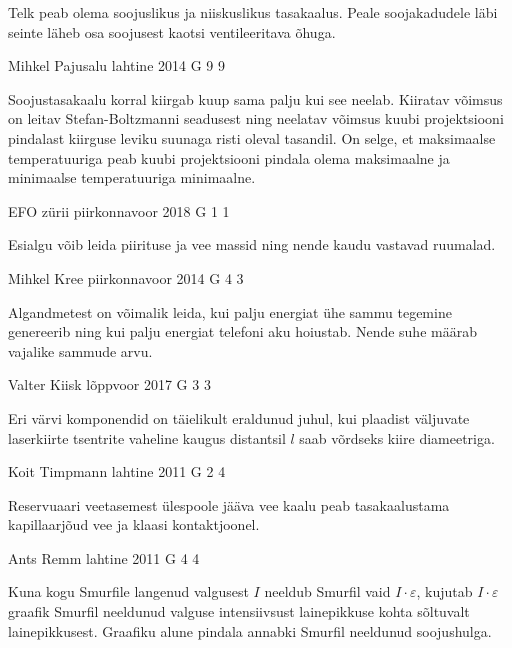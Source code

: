 \documentclass[11pt, twoside]{article}
\begin{document}
{{\ifHint
Telk peab olema soojuslikus ja niiskuslikus tasakaalus. Peale soojakadudele läbi seinte läheb osa soojusest kaotsi ventileeritava õhuga.
\fi
}

{Mihkel Pajusalu} %
{lahtine} %
{2014} %
{G 9} %
{9} %
{

\ifHint
Soojustasakaalu korral kiirgab kuup sama palju kui see neelab. Kiiratav võimsus on leitav Stefan-Boltzmanni seadusest ning neelatav võimsus kuubi projektsiooni pindalast kiirguse leviku suunaga risti oleval tasandil. On selge, et maksimaalse temperatuuriga peab kuubi projektsiooni pindala olema maksimaalne ja minimaalse temperatuuriga minimaalne.
\fi
}

{EFO zürii} %
{piirkonnavoor} %
{2018} %
{G 1} %
{1} %
{

\ifHint
Esialgu võib leida piirituse ja vee massid ning nende kaudu vastavad ruumalad.
\fi
}

{Mihkel Kree} %
{piirkonnavoor} %
{2014} %
{G 4} %
{3} %
{

\ifHint
Algandmetest on võimalik leida, kui palju energiat ühe sammu tegemine genereerib ning kui palju energiat telefoni aku hoiustab. Nende suhe määrab vajalike sammude arvu.
\fi
}

{Valter Kiisk} %
{lõppvoor} %
{2017} %
{G 3} %
{3} %
{

\ifHint
Eri värvi komponendid on täielikult eraldunud juhul, kui plaadist väljuvate laserkiirte tsentrite vaheline kaugus distantsil $l$ saab võrdseks kiire diameetriga.
\fi
}

{Koit Timpmann} %
{lahtine} %
{2011} %
{G 2} %
{4} %
{

\ifHint
Reservuaari veetasemest ülespoole jääva vee kaalu peab tasakaalustama kapillaarjõud vee ja klaasi kontaktjoonel.
\fi
}

{Ants Remm} %
{lahtine} %
{2011} %
{G 4} %
{4} %
{

\ifHint
Kuna kogu Smurfile langenud valgusest $I$ neeldub Smurfil vaid $ I \cdot\varepsilon $, kujutab $ I \cdot \varepsilon $ graafik Smurfil neeldunud valguse intensiivsust lainepikkuse kohta sõltuvalt lainepikkusest. Graafiku alune pindala annabki Smurfil neeldunud soojushulga. 
\fi
}

}
\end{document}

